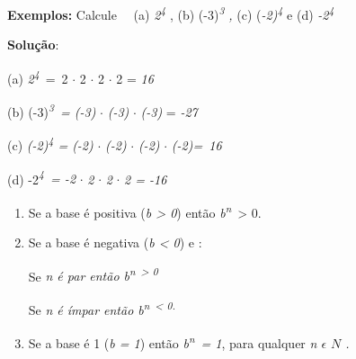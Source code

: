 \documentclass[12pt]{article}
\renewcommand{\_}{\kern-1.5pt\textunderscore\kern-1.5pt}
\begin{document}
\begin{enumerate}
\vspace{\baselineskip}
\setlength{\parskip}{8.04pt}
\textbf{Exemplos: }Calcule \ \  (a) \textit{2\textsuperscript{4}} , (b) (-3)\textit{\textsuperscript{3} , } (c) (\textit{-2)\textsuperscript{4}} e (d) \textit{-2\textsuperscript{4}}\par

\textbf{Solução}: \par

(a) \textit{2\textsuperscript{4}}\ =\ 2 $ \cdot $  2 $ \cdot $  2  $ \cdot $  2  = \textit{16}\par

(b) (-3)\textit{\textsuperscript{3}\  = (-3)} $ \cdot $  \textit{(-3)} $ \cdot $  \textit{(-3)} = \textit{-27}\par

(c) \textit{(-2)\textsuperscript{4} = (-2)} $ \cdot $  \textit{(-2)} $ \cdot $  \textit{(-2)} $ \cdot $  \textit{(-2)=\ 16  }\par

(d) -2\textit{\textsuperscript{4}\  = -2 }$ \cdot $  \textit{2} $ \cdot $  \textit{2} $ \cdot $ \textit{2 = -16}\par

\par 
\begin{enumerate}
	\item Se a base é positiva (\textit{b > 0}) então \textit{b\textsuperscript{n}}\  > 0.\par

	\item Se a base é negativa (\textit{b < 0}) e :\par

\tab Se \textit{n é par então b\textsuperscript{n\  > 0}}\par

\tab Se \textit{n é ímpar então b\textsuperscript{n\  < 0.}}\par

	\item Se a base é 1 (\textit{b = 1}) então \textit{b\textsuperscript{n}}\  \textit{= 1}, para qualquer \textit{n $ \epsilon $   \( N \) .} 
\end{enumerate}\par



\end{enumerate}
\end{document}
